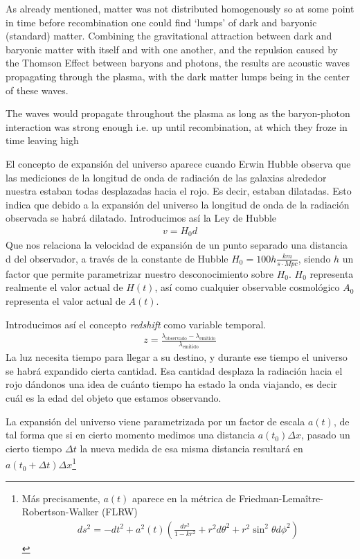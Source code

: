 As already mentioned, matter was not distributed homogenously so at some point in time before recombination one could find `lumps' of dark and baryonic (standard) matter. Combining the gravitational attraction between dark and baryonic matter with itself and with one another, and the repulsion caused by the Thomson Effect between baryons and photons, the results are acoustic waves propagating through the plasma, with the dark matter lumps being in the center of these waves. 

The waves would propagate throughout the plasma as long as the baryon-photon interaction was strong enough i.e. up until recombination, at which they froze in time leaving high 


El concepto de expansión del universo aparece cuando Erwin Hubble observa que las mediciones de la longitud de onda de radiación de las galaxias alrededor nuestra estaban todas desplazadas hacia el rojo. Es decir, estaban dilatadas. Esto indica que debido a la expansión del universo la longitud de onda de la radiación observada se habrá dilatado. Introducimos así la Ley de Hubble 
\begin{align}
	v = H_0 d
	\label{eq:ley-hubble}
\end{align}
Que nos relaciona la velocidad de expansión de un punto separado una distancia d del observador, a través de la constante de Hubble $H_0 = 100h \frac{km}{s \cdot Mpc}$, siendo $h$ un factor que permite parametrizar nuestro desconocimiento sobre $H_0$. $H_0$ representa realmente el valor actual de $H(t)$, así como cualquier observable cosmológico $A_0$ representa el valor actual de $A(t)$. 

Introducimos así el concepto \textit{redshift} como variable temporal.
\begin{align}
	z = \frac{\lambda_{\text{observado}} - \lambda_{\text{emitido}}}{\lambda_{\text{emitido}}}
	\label{eq:redshift}
\end{align}
La luz necesita tiempo para llegar a su destino, y durante ese tiempo el universo se habrá expandido cierta cantidad. Esa cantidad desplaza la radiación hacia el rojo dándonos una idea de cuánto tiempo ha estado la onda viajando, es decir cuál es la edad del objeto que estamos observando.

La expansión del universo viene parametrizada por un factor de escala $a(t)$, de tal forma que si en cierto momento medimos una distancia $a(t_0)\Delta x$, pasado un cierto tiempo $\Delta t$ la nueva medida de esa misma distancia resultará en $a(t_0+\Delta t) \Delta x$\footnote{Más precisamente, $a(t)$ aparece en la métrica de Friedman-Lemaître-Robertson-Walker (FLRW) 
\begin{align}
	ds^{2} = -dt ^{2} + a^{2}(t) \left( \frac{dr^{2}}{1-kr^2} + r^2d\theta^2 + r^2 \sin ^2 \theta d\phi^2\right) 
\end{align}}

